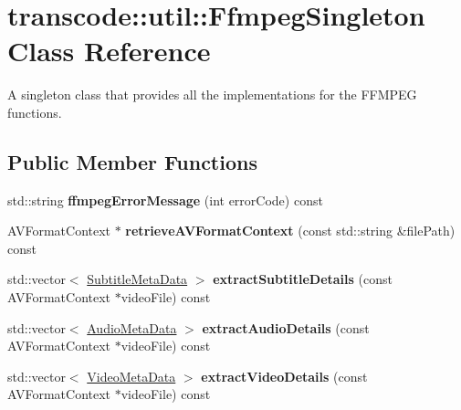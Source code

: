 \hypertarget{classtranscode_1_1util_1_1FfmpegSingleton}{
\section{transcode::util::FfmpegSingleton Class Reference}
\label{classtranscode_1_1util_1_1FfmpegSingleton}
}


A singleton class that provides all the implementations for the FFMPEG functions.  


\subsection*{Public Member Functions}
\begin{DoxyCompactItemize}
\item 
\hypertarget{classtranscode_1_1util_1_1FfmpegSingleton_afcaff88a65a5a7392ef221c6124c7f47}{
std::string {\bfseries ffmpegErrorMessage} (int errorCode) const }
\label{classtranscode_1_1util_1_1FfmpegSingleton_afcaff88a65a5a7392ef221c6124c7f47}

\item 
\hypertarget{classtranscode_1_1util_1_1FfmpegSingleton_a2df8734a7a6b106757b1c9041ed0b3e8}{
AVFormatContext $\ast$ {\bfseries retrieveAVFormatContext} (const std::string \&filePath) const }
\label{classtranscode_1_1util_1_1FfmpegSingleton_a2df8734a7a6b106757b1c9041ed0b3e8}

\item 
\hypertarget{classtranscode_1_1util_1_1FfmpegSingleton_a82ca88208ef34718ee20ee99beb25101}{
std::vector$<$ \hyperlink{structtranscode_1_1SubtitleMetaData}{SubtitleMetaData} $>$ {\bfseries extractSubtitleDetails} (const AVFormatContext $\ast$videoFile) const }
\label{classtranscode_1_1util_1_1FfmpegSingleton_a82ca88208ef34718ee20ee99beb25101}

\item 
\hypertarget{classtranscode_1_1util_1_1FfmpegSingleton_aac69472179a03040d17d072c1987c5ce}{
std::vector$<$ \hyperlink{structtranscode_1_1AudioMetaData}{AudioMetaData} $>$ {\bfseries extractAudioDetails} (const AVFormatContext $\ast$videoFile) const }
\label{classtranscode_1_1util_1_1FfmpegSingleton_aac69472179a03040d17d072c1987c5ce}

\item 
\hypertarget{classtranscode_1_1util_1_1FfmpegSingleton_a7ecd105f56b9ac9e1c619453f4c872f2}{
std::vector$<$ \hyperlink{structtranscode_1_1VideoMetaData}{VideoMetaData} $>$ {\bfseries extractVideoDetails} (const AVFormatContext $\ast$videoFile) const }
\label{classtranscode_1_1util_1_1FfmpegSingleton_a7ecd105f56b9ac9e1c619453f4c872f2}


\end{DoxyCompactItemize}
